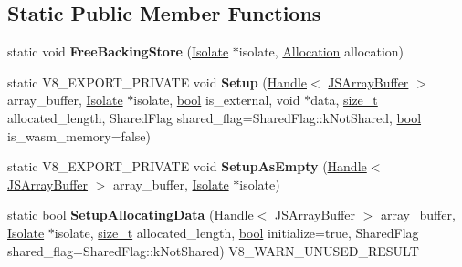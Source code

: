 \subsection*{Static Public Member Functions}
\begin{DoxyCompactItemize}
\item 
\mbox{\label{classv8_1_1internal_1_1JSArrayBuffer_a391c7485a7691c01411e73eabc67853b}} 
static void {\bfseries Free\+Backing\+Store} (\mbox{\hyperlink{classv8_1_1internal_1_1Isolate}{Isolate}} $\ast$isolate, \mbox{\hyperlink{structv8_1_1internal_1_1JSArrayBuffer_1_1Allocation}{Allocation}} allocation)
\item 
\mbox{\label{classv8_1_1internal_1_1JSArrayBuffer_a19da6c2ab04b86c766c9ff7d080a97e8}} 
static V8\+\_\+\+E\+X\+P\+O\+R\+T\+\_\+\+P\+R\+I\+V\+A\+TE void {\bfseries Setup} (\mbox{\hyperlink{classv8_1_1internal_1_1Handle}{Handle}}$<$ \mbox{\hyperlink{classv8_1_1internal_1_1JSArrayBuffer}{J\+S\+Array\+Buffer}} $>$ array\+\_\+buffer, \mbox{\hyperlink{classv8_1_1internal_1_1Isolate}{Isolate}} $\ast$isolate, \mbox{\hyperlink{classbool}{bool}} is\+\_\+external, void $\ast$data, \mbox{\hyperlink{classsize__t}{size\+\_\+t}} allocated\+\_\+length, Shared\+Flag shared\+\_\+flag=Shared\+Flag\+::k\+Not\+Shared, \mbox{\hyperlink{classbool}{bool}} is\+\_\+wasm\+\_\+memory=false)
\item 
\mbox{\label{classv8_1_1internal_1_1JSArrayBuffer_aa354f686c94caa314a2bc9dcfbfdc2dc}} 
static V8\+\_\+\+E\+X\+P\+O\+R\+T\+\_\+\+P\+R\+I\+V\+A\+TE void {\bfseries Setup\+As\+Empty} (\mbox{\hyperlink{classv8_1_1internal_1_1Handle}{Handle}}$<$ \mbox{\hyperlink{classv8_1_1internal_1_1JSArrayBuffer}{J\+S\+Array\+Buffer}} $>$ array\+\_\+buffer, \mbox{\hyperlink{classv8_1_1internal_1_1Isolate}{Isolate}} $\ast$isolate)
\item 
\mbox{\label{classv8_1_1internal_1_1JSArrayBuffer_a65dc55353c84f26b38ca95f0021946bf}} 
static \mbox{\hyperlink{classbool}{bool}} {\bfseries Setup\+Allocating\+Data} (\mbox{\hyperlink{classv8_1_1internal_1_1Handle}{Handle}}$<$ \mbox{\hyperlink{classv8_1_1internal_1_1JSArrayBuffer}{J\+S\+Array\+Buffer}} $>$ array\+\_\+buffer, \mbox{\hyperlink{classv8_1_1internal_1_1Isolate}{Isolate}} $\ast$isolate, \mbox{\hyperlink{classsize__t}{size\+\_\+t}} allocated\+\_\+length, \mbox{\hyperlink{classbool}{bool}} initialize=true, Shared\+Flag shared\+\_\+flag=Shared\+Flag\+::k\+Not\+Shared) V8\+\_\+\+W\+A\+R\+N\+\_\+\+U\+N\+U\+S\+E\+D\+\_\+\+R\+E\+S\+U\+LT
\end{DoxyCompactItemize}
